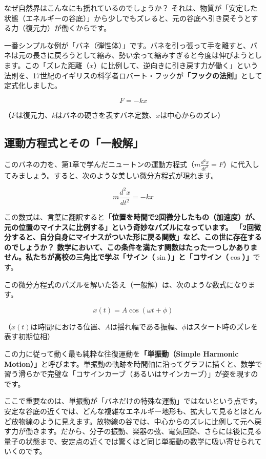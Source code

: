 なぜ自然界はこんなにも揺れているのでしょうか？ それは、物質が「安定した状態（エネルギーの谷底）」から少しでもズレると、元の谷底へ引き戻そうとする力（復元力）が働くからです。

一番シンプルな例が「バネ（弾性体）」です。バネを引っ張って手を離すと、バネは元の長さに戻ろうとして縮み、勢い余って縮みすぎると今度は伸びようとします。この「ズレた距離（\(x\)）に比例して、逆向きに引き戻す力が働く」という法則を、17世紀のイギリスの科学者ロバート・フックが\textbf{「フックの法則」}として定式化しました。

\[F = -kx\]

（\(F\)は復元力、\(k\)はバネの硬さを表すバネ定数、\(x\)は中心からのズレ）

\subsection{運動方程式とその「一般解」}

このバネの力を、第1章で学んだニュートンの運動方程式（\(m \frac{d^2x}{dt^2} = F\)）に代入してみましょう。すると、次のような美しい微分方程式が現れます。

\[m \frac{d^2x}{dt^2} = -kx\]

この数式は、言葉に翻訳すると\textbf{「位置を時間で2回微分したもの（加速度）が、元の位置のマイナスに比例する」という奇妙なパズルになっています。 「2回微分すると、自分自身にマイナスがついた形に戻る関数」など、この世に存在するのでしょうか？ 数学において、この条件を満たす関数はたった一つしかありません。私たちが高校の三角比で学ぶ「サイン（\(\sin\)）」と「コサイン（\(\cos\)）」}です。

この微分方程式のパズルを解いた答え（一般解）は、次のような数式になります。

\[x(t) = A \cos(\omega t + \phi)\]

（\(x(t)\)は時間\(t\)における位置、\(A\)は揺れ幅である振幅、\(\phi\)はスタート時のズレを表す初期位相）

この力に従って動く最も純粋な往復運動を\textbf{「単振動（Simple Harmonic Motion）」}と呼びます。単振動の軌跡を時間軸に沿ってグラフに描くと、数学で習う滑らかで完璧な「コサインカーブ（あるいはサインカーブ）」が姿を現すのです。

ここで重要なのは、単振動が「バネだけの特殊な運動」ではないという点です。安定な谷底の近くでは、どんな複雑なエネルギー地形も、拡大して見るとほとんど放物線のように見えます。放物線の谷では、中心からのズレに比例して元へ戻す力が働きます。だから、分子の振動、楽器の弦、電気回路、さらには後に見る量子の状態まで、安定点の近くでは驚くほど同じ単振動の数学に吸い寄せられていくのです。

